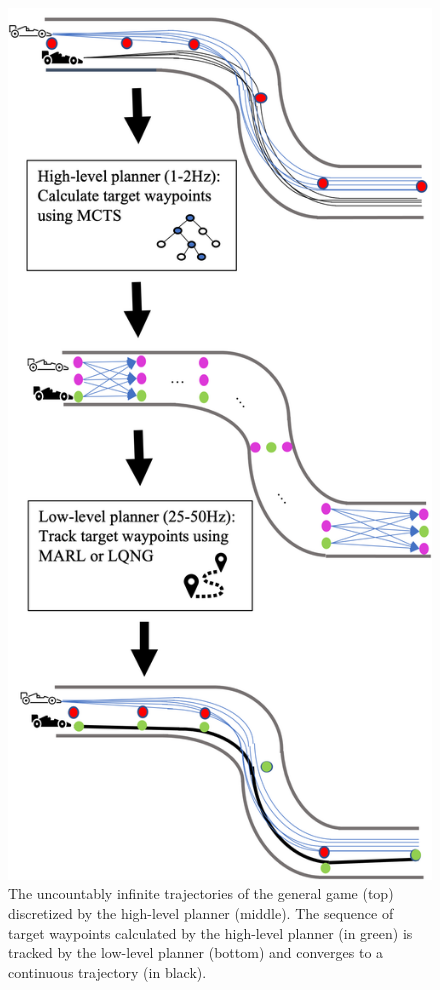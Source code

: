\begin{figure}
  \centering
    \includegraphics[height=0.8\textheight]{Figures/FormulationBreakdownVert.png}
  \caption{The uncountably infinite trajectories of the general game (top) discretized by the high-level planner (middle). The sequence of target waypoints calculated by the high-level planner (in green) is tracked by the low-level planner (bottom) and converges to a continuous trajectory (in black).}
  \label{fig:overall_control}
\end{figure}
